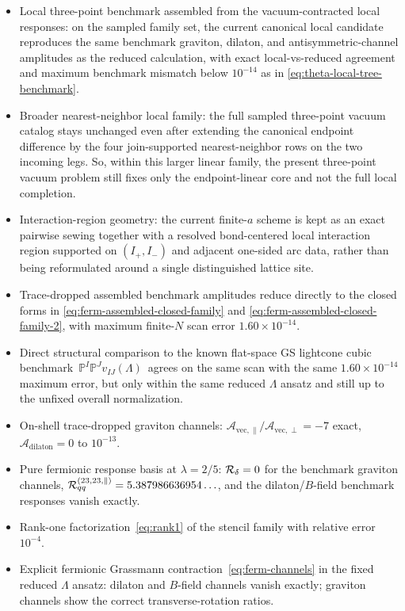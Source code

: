 \documentclass[11pt]{article}
\begin{document}
\begin{itemize}
\item Local three-point benchmark assembled from the vacuum-contracted local responses: on the sampled family set, the current canonical local candidate reproduces the same benchmark graviton, dilaton, and antisymmetric-channel amplitudes as the reduced calculation, with exact local-vs-reduced agreement and maximum benchmark mismatch below $10^{-14}$ as in \eqref{eq:theta-local-tree-benchmark}.
\item Broader nearest-neighbor local family: the full sampled three-point vacuum catalog stays unchanged even after extending the canonical endpoint difference by the four join-supported nearest-neighbor rows on the two incoming legs. So, within this larger linear family, the present three-point vacuum problem still fixes only the endpoint-linear core and not the full local completion.
\item Interaction-region geometry: the current finite-$a$ scheme is kept as an exact pairwise sewing together with a resolved bond-centered local interaction region supported on $(I_+,I_-)$ and adjacent one-sided arc data, rather than being reformulated around a single distinguished lattice site.
\item Trace-dropped assembled benchmark amplitudes reduce directly to the closed forms in \eqref{eq:ferm-assembled-closed-family} and \eqref{eq:ferm-assembled-closed-family-2}, with maximum finite-$N$ scan error $1.60\times 10^{-14}$.
\item Direct structural comparison to the known flat-space GS lightcone cubic benchmark $\,\mathbb{P}^I\mathbb{P}^Jv_{IJ}(\Lambda)\,$ agrees on the same scan with the same $1.60\times 10^{-14}$ maximum error, but only within the same reduced $\Lambda$ ansatz and still up to the unfixed overall normalization.
\item On-shell trace-dropped graviton channels: $\mathcal{A}_{\mathrm{vec},\parallel}/\mathcal{A}_{\mathrm{vec},\perp} = -7$ exact, $\mathcal{A}_{\mathrm{dilaton}} = 0$ to $10^{-13}$.
\item Pure fermionic response basis at $\lambda = 2/5$: ${\cal R}_\delta = 0$ for the benchmark graviton channels, ${\cal R}^{(23,23,\parallel)}_{qq} = 5.387986636954\ldots$, and the dilaton/$B$-field benchmark responses vanish exactly.
\item Rank-one factorization~\eqref{eq:rank1} of the stencil family with relative error $10^{-4}$.
\item Explicit fermionic Grassmann contraction~\eqref{eq:ferm-channels} in the fixed reduced $\Lambda$ ansatz: dilaton and $B$-field channels vanish exactly; graviton channels show the correct transverse-rotation ratios.

\end{itemize}
\end{document}

